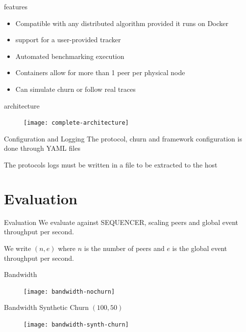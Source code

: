 \begin{frame}{\sys{} features}
    \begin{itemize}
    	\item Compatible with any distributed algorithm provided it runs on Docker
    	\item support for a user-provided tracker
    	\item Automated benchmarking execution
    	\item Containers allow for more than 1 peer per physical node
    	\item Can simulate churn or follow real traces
    \end{itemize}
\end{frame}

\begin{frame}{\sys{} architecture}
	\begin{figure}
		\texttt{[image: complete-architecture]}
	\end{figure}
\end{frame}

\begin{frame}{\sys{} Configuration and Logging}
	The protocol, churn and framework configuration is done through \textsc{YAML} files
	
	The protocols logs must be written in a file to be extracted to the host
\end{frame}

\section{Evaluation}
\subtitle[Evaluation]{Evaluation}

\begin{frame}{Evaluation}
    We evaluate \epto{} against \jgroups{} SEQUENCER, scaling peers and global event throughput per second.
    
    We write $(n,e)$ where $n$ is the number of peers and $e$ is the global event throughput per second.
\end{frame}

\begin{frame}{Bandwidth}
	\begin{figure}
		\texttt{[image: bandwidth-nochurn]}
	\end{figure}
\end{frame}

\begin{frame}{Bandwidth Synthetic Churn $(100,50)$}
	\begin{figure}
		\texttt{[image: bandwidth-synth-churn]}
	\end{figure}
\end{frame}

